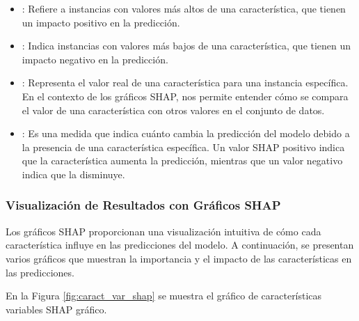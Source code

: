 \begin{itemize}
    \item {}: Refiere a instancias con valores más altos de una característica, que tienen un impacto positivo en la predicción.
    
    \item {}: Indica instancias con valores más bajos de una característica, que tienen un impacto negativo en la predicción.
    
    \item {}: Representa el valor real de una característica para una instancia específica. En el contexto de los gráficos SHAP, nos permite entender cómo se compara el valor de una característica con otros valores en el conjunto de datos.
    
    \item {}: Es una medida que indica cuánto cambia la predicción del modelo debido a la presencia de una característica específica. Un valor SHAP positivo indica que la característica aumenta la predicción, mientras que un valor negativo indica que la disminuye.
\end{itemize}


\subsubsection{Visualización de Resultados con Gráficos SHAP}

Los gráficos SHAP proporcionan una visualización intuitiva de cómo cada característica influye en las predicciones del modelo. A continuación, se presentan varios gráficos que muestran la importancia y el impacto de las características en las predicciones.

En la Figura \ref{fig:caract_var_shap} se muestra el gráfico de características variables SHAP gráfico.

